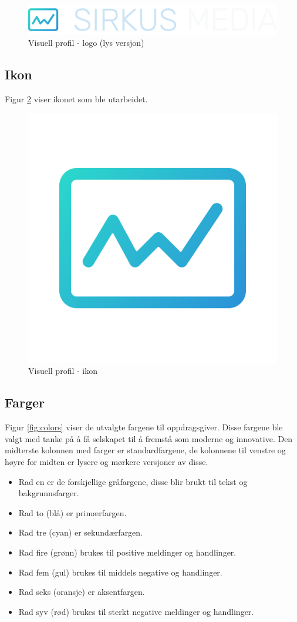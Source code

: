 \begin{figure}[H]
    \centering
    \includegraphics[width=.5\textwidth]{design/logo-light.png}
    \caption{Visuell profil - logo (lys versjon)}
    \label{fig:logo-light}
\end{figure}

\subsection{Ikon}
Figur \ref{fig:icon} viser ikonet som ble utarbeidet.

\begin{figure}[H]
    \centering
    \includegraphics[width=.25\textwidth]{design/logo-icon.png}
    \caption{Visuell profil - ikon}
    \label{fig:icon}
\end{figure}

\subsection{Farger}
Figur \ref{fig:colors} viser de utvalgte fargene til oppdragsgiver. Disse fargene ble valgt med tanke på å få selskapet til å fremstå som moderne og innovative.
Den midterste kolonnen med farger er standardfargene, de kolonnene til venstre og høyre for midten er lysere og mørkere versjoner av disse.
\begin{itemize}
    \item Rad en er de forskjellige gråfargene, disse blir brukt til tekst og bakgrunnsfarger.
    \item Rad to (blå) er primærfargen.
    \item Rad tre (cyan) er sekundærfargen.
    \item Rad fire (grønn) brukes til positive meldinger og handlinger.
    \item Rad fem (gul) brukes til middels negative og handlinger.
    \item Rad seks (oransje) er aksentfargen.
    \item Rad syv (rød) brukes til sterkt negative meldinger og handlinger.
\end{itemize}

